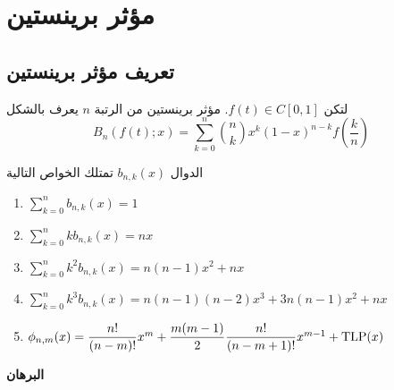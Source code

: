 \chapter{مؤثر برينستين}

\section{تعريف مؤثر برينستين}

\begin{definition}
	لتكن $f(t) \in C[0,1]$. مؤثر برينستين من الرتبة $n$ يعرف بالشكل
	\[
	B_n(f(t);x) = \sum_{k=0}^{n} \binom{n}{k} x^k (1-x)^{n-k} f\left(\frac{k}{n}\right) 
	\]
\end{definition}

\begin{theorem}
	الدوال $b_{n,k}(x)$ تمتلك الخواص التالية
	\begin{english}
		\begin{enumerate}[label=\textbf{\arabic*.}]
			\item \(\sum_{k=0}^{n} b_{n,k}(x) = 1\)
			\item \(\sum_{k=0}^{n} kb_{n,k}(x) = nx\)
			\item \(\sum_{k=0}^{n} k^2 b_{n,k}(x) = n(n-1)x^2 + nx\)
			\item \(\sum_{k=0}^{n} k^3 b_{n,k}(x) = n(n-1)(n-2)x^3 + 3n(n-1)x^2 + nx\)
			\item \(\phi_{n, m}(x) = \dfrac{n!}{(n-m)!} x^m + \dfrac{m(m-1)}{2}\dfrac{n!}{(n-m+1)!} x^{m-1} + \operatorname{TLP}(x)\)\\[10pt]
			\hspace*{200pt}
		\end{enumerate}
	\end{english}
\end{theorem}
\noindent
\textbf{البرهان}
